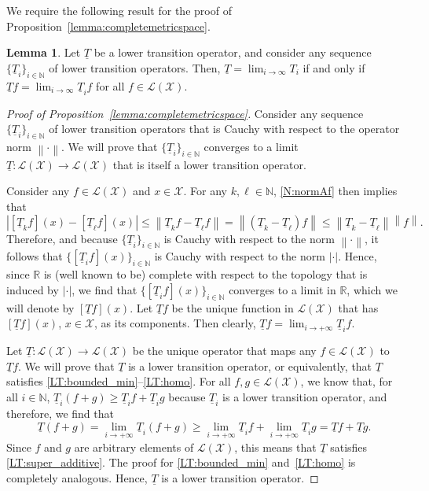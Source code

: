 \documentclass[10pt,a4paper]{paper}
\theoremstyle{definition}
\newtheorem{lemma}[theorem]{Lemma}
\newcommand{\nats}{\mathbb{N}}
\newcommand{\reals}{\mathbb{R}}
\newcommand{\states}{\mathcal{X}}
\newcommand{\lt}{\underline{T}}
\newcommand{\gambles}{\mathcal{L}}
\newcommand{\gamblesX}{\gambles(\states)}
\newcommand{\norm}[1]{\left\lVert #1 \right\rVert}
\newcommand{\abs}[1]{\left\vert #1 \right\vert}
\begin{document}
We require the following result for the proof of Proposition~\ref{lemma:completemetricspace}.
\begin{lemma}\cite[Proposition~1]{DeBock:2016}\label{lemma:lowertrans_limit_iff_pointwise_limit}
Let $\lt$ be a lower transition operator, and consider any sequence $\{\lt_i\}_{i\in\nats}$ of lower transition operators. Then, $\lt=\lim_{i\to\infty}T_i$ if and only if $\lt f=\lim_{i\to\infty}\lt_i f$ for all $f\in\gamblesX$.
\end{lemma}

\begin{proof}[Proof of Proposition~\ref{lemma:completemetricspace}]
Consider any sequence $\{\lt_i\}_{i\in\nats}$ of lower transition operators that is Cauchy with respect to the operator norm $\norm{\cdot}$. We will prove that $\{\lt_i\}_{i\in\nats}$ converges to a limit $\lt\colon\gamblesX\to\gamblesX$ that is itself a lower transition operator.

Consider any $f\in\gamblesX$ and $x\in\states$. For any $k,\ell\in\nats$, \eqref{N:normAf} then implies that
\begin{equation*}
\abs{[\lt_k f](x)-[\lt_\ell f](x)}
\leq\norm{\lt_k f-\lt_\ell f}
=\norm{(\lt_k-\lt_\ell)f}
\leq\norm{\lt_k-\lt_\ell}\norm{f}.
\end{equation*}
Therefore, and because $\{\lt_i\}_{i\in\nats}$ is Cauchy with respect to the norm $\norm{\cdot}$, it follows that $\{[\lt_i f](x)\}_{i\in\nats}$ is Cauchy with respect to the norm $\abs{\cdot}$. Hence, since $\reals$ is (well known to be) complete with respect to the topology that is induced by $\abs{\cdot}$, we find that $\{[\lt_i f](x)\}_{i\in\nats}$ converges to a limit in $\reals$, which we will denote by $[\lt f](x)$. Let $\lt f$ be the unique function in $\gamblesX$ that has $[\lt f](x)$, $x\in\states$, as its components. Then clearly, $\lt f=\lim_{i\to+\infty}\lt_if$. 

Let $\lt\colon\gamblesX\to\gamblesX$ be the unique operator that maps any $f\in\gamblesX$ to $\lt f$. We will prove that $\lt$ is a lower transition operator, or equivalently, that $\lt$ satisfies \ref{LT:bounded_min}--\ref{LT:homo}. For all $f,g\in\gamblesX$, we know that, for all $i\in\nats$, $\lt_i(f+g)\geq\lt_if+\lt_ig$ because $\lt_i$ is a lower transition operator, and therefore, we find that
\begin{equation*}
\lt(f+g)
=\lim_{i\to+\infty}\lt_i(f+g)
\geq\lim_{i\to+\infty}\lt_if
+
\lim_{i\to+\infty}\lt_ig=\lt f+\lt g.
\end{equation*}
Since $f$ and $g$ are arbitrary elements of $\gamblesX$, this means that $\lt$ satisfies \ref{LT:super_additive}. The proof for \ref{LT:bounded_min} and~\ref{LT:homo} is completely analogous. Hence, $\lt$ is a lower transition operator. 


\end{proof}
\end{document}
